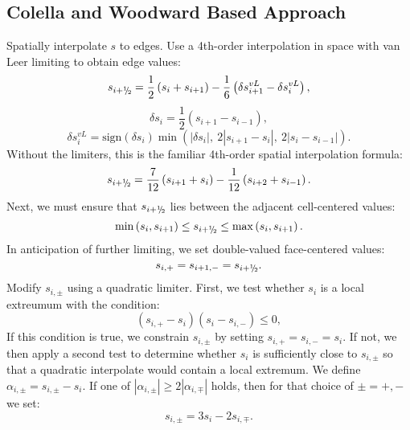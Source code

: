 \subsection{Colella and Woodward Based Approach}\label{Sec:ColellaWoodward}
Spatially interpolate $s$ to edges.
Use a 4th-order interpolation in space with van Leer limiting to obtain edge values:
\begin{equation}
s_{i+\myhalf} = \frac{1}{2}\left(s_{i} + s_{i+1}\right) - \frac{1}{6}\left(\delta s_{i+1}^{vL} - \delta s_{i}^{vL}\right),
\end{equation}
\begin{equation}
\delta s_i = \frac{1}{2}\left(s_{i+1}-s_{i-1}\right),
\end{equation}
\begin{equation}
\delta s_i^{vL} = \text{sign}(\delta s_i)\min\left(|\delta s_i|, ~ 2|s_{i+1}-s_{i}|, ~ 2|s_i-s_{i-1}|\right).
\end{equation}
Without the limiters, this is the familiar 4th-order spatial interpolation formula:
\begin{equation}
s_{i+\myhalf} = \frac{7}{12}\left(s_{i+1}+s_i\right) - \frac{1}{12}\left(s_{i+2}+s_{i-1}\right).
\end{equation}
Next, we must ensure that $s_{i+\myhalf}$ lies between the adjacent 
cell-centered values:
\begin{equation}
\min\left(s_{i},s_{i+1}\right) \le s_{i+\myhalf} \le \max\left(s_{i},s_{i+1}\right).
\end{equation}
In anticipation of further limiting, we set double-valued face-centered values:
\begin{equation}
s_{i,+} = s_{i+1,-} = s_{i+\myhalf}.
\end{equation}
Modify $s_{i,\pm}$ using a quadratic limiter.
First, we test whether 
$s_i$ is a local extreumum with the condition:
\begin{equation}
\left(s_{i,+}-s_i\right)\left(s_i-s_{i,-}\right) \le 0,
\end{equation}
If this condition is true, we constrain $s_{i,\pm}$ by setting 
$s_{i,+} = s_{i,-} = s_i$.  If not, we then apply a second test to determine 
whether $s_i$ is sufficiently close to $s_{i,\pm}$ so that a quadratic 
interpolate would contain a local extremum.  We define 
$\alpha_{i,\pm} = s_{i,\pm} - s_i$.  If one of $|\alpha_{i,\pm}| \ge 2|\alpha_{i,\mp}|$
holds, then for that choice of $\pm = +,-$ we set:
\begin{equation}
s_{i,\pm} = 3s_i - 2s_{i,\mp}.
\end{equation}
